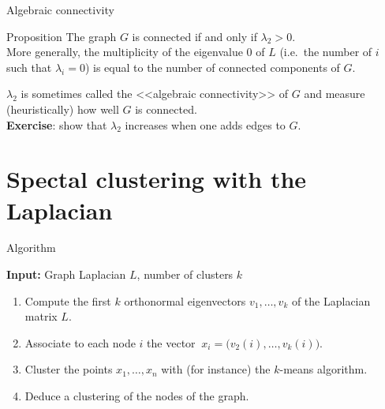 \documentclass{beamer}
\begin{document}
\begin{frame}[t]{Algebraic connectivity}
	\grid

	\begin{block}{Proposition}
		The graph $G$ is connected if and only if $\lambda_2 > 0$.
		\\
		More generally, the multiplicity of the eigenvalue $0$ of $L$ (i.e.\ the number of $i$ such that $\lambda_i = 0$) is equal to the number of connected components of $G$.
\end{block}

\vspace{0.3cm}
$\lambda_2$ is sometimes called the <<algebraic connectivity>> of $G$ and measure (heuristically) how well $G$ is connected.
\\

\vspace{0.3cm}
\textbf{Exercise}: show that $\lambda_2$ increases when one adds edges to $G$.
\end{frame}

\section{Spectal clustering with the Laplacian}

\begin{frame}[t]{Algorithm}
	\grid

	\vspace{-0.2cm}
	\textbf{Input:} Graph Laplacian $L$, number of clusters $k$
	\begin{enumerate}
		\item Compute the first $k$ orthonormal eigenvectors $v_1, \dots, v_k$ of the Laplacian matrix $L$.
			\vspace{0.1cm}
		\item Associate to each node $i$ the vector $\ x_i = \big(v_{2}(i), \dots, v_k(i) \big)$.
			\vspace{0.1cm}
		\item Cluster the points $x_1, \dots, x_n$ with (for instance) the $k$-means algorithm.
			\vspace{0.1cm}
		\item Deduce a clustering of the nodes of the graph.
	\end{enumerate}

\end{frame}
\end{document}
